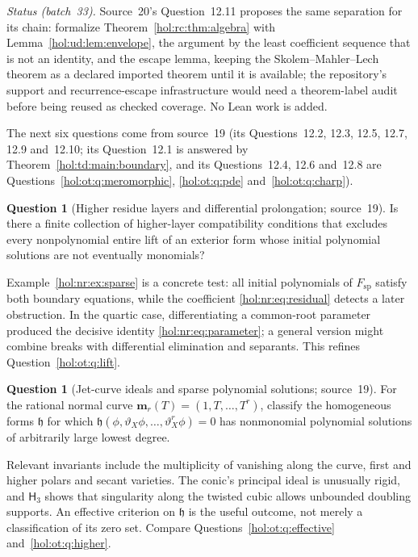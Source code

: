 \documentclass[11pt]{article}
\numberwithin{equation}{section}
\theoremstyle{definition}
\newtheorem{question}[theorem]{Question}
\theoremstyle{remark}
\begin{document}
\emph{Status (batch~33).} Source~20's Question~12.11 proposes the same
separation for its chain: formalize Theorem~\ref{hol:rc:thm:algebra} with
Lemma~\ref{hol:ud:lem:envelope}, the argument by the least coefficient sequence
that is not an identity, and the escape lemma, keeping the
Skolem--Mahler--Lech theorem as a declared imported theorem until it is
available; the repository's support and recurrence-escape infrastructure would
need a theorem-label audit before being reused as checked coverage. No Lean
work is added.

The next six questions come from source~19 (its Questions~12.2, 12.3, 12.5,
12.7, 12.9 and~12.10; its Question~12.1 is answered by
Theorem~\ref{hol:td:main:boundary}, and its Questions~12.4, 12.6 and~12.8 are
Questions~\ref{hol:ot:q:meromorphic}, \ref{hol:ot:q:pde}
and~\ref{hol:ot:q:charp}).

\begin{question}[Higher residue layers and differential prolongation;
source~19]\label{hol:nr:q:layers}
Is there a finite collection of higher-layer compatibility conditions that
excludes every nonpolynomial entire lift of an exterior form whose initial
polynomial solutions are not eventually monomials?
\end{question}

Example~\ref{hol:nr:ex:sparse} is a concrete test: all initial polynomials of
$F_{\mathrm{sp}}$ satisfy both boundary equations, while the coefficient
\eqref{hol:nr:eq:residual} detects a later obstruction. In the quartic case,
differentiating a common-root parameter produced the decisive identity
\eqref{hol:nr:eq:parameter}; a general version might combine breaks with
differential elimination and separants. This refines
Question~\ref{hol:ot:q:lift}.

\begin{question}[Jet-curve ideals and sparse polynomial solutions; source~19]
\label{hol:nr:q:jetcurve}
For the rational normal curve $\mathbf m_r(T)=(1,T,\ldots,T^r)$, classify the
homogeneous forms $\mathfrak h$ for which
$\mathfrak h(\phi,\vartheta_X\phi,\ldots,\vartheta_X^r\phi)=0$ has nonmonomial
polynomial solutions of arbitrarily large lowest degree.
\end{question}

Relevant invariants include the multiplicity of vanishing along the curve,
first and higher polars and secant varieties. The conic's principal ideal is
unusually rigid, and $\mathsf H_3$ shows that singularity along the twisted
cubic allows unbounded doubling supports. An effective criterion on
$\mathfrak h$ is the useful outcome, not merely a classification of its zero
set. Compare Questions~\ref{hol:ot:q:effective} and~\ref{hol:ot:q:higher}.
\end{document}
